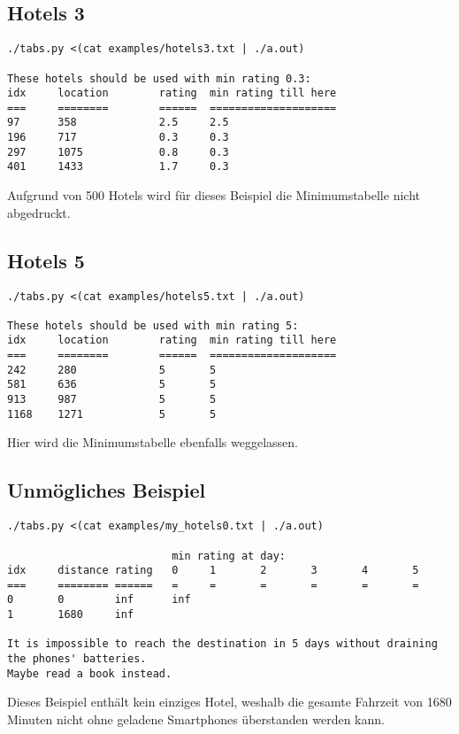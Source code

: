 \documentclass[a4paper,10pt,ngerman]{scrartcl}
\begin{document}
\subsection*{Hotels 3}
\begin{lstlisting}
./tabs.py <(cat examples/hotels3.txt | ./a.out)

These hotels should be used with min rating 0.3:
idx     location        rating  min rating till here
===     ========        ======  ====================
97      358             2.5     2.5
196     717             0.3     0.3
297     1075            0.8     0.3
401     1433            1.7     0.3
\end{lstlisting}
Aufgrund von 500 Hotels wird für dieses Beispiel die Minimumstabelle nicht abgedruckt.

\subsection*{Hotels 5}
\begin{lstlisting}
./tabs.py <(cat examples/hotels5.txt | ./a.out)

These hotels should be used with min rating 5:
idx     location        rating  min rating till here
===     ========        ======  ====================
242     280             5       5
581     636             5       5
913     987             5       5
1168    1271            5       5
\end{lstlisting}
Hier wird die Minimumstabelle ebenfalls weggelassen.

\subsection*{Unmögliches Beispiel}
\begin{lstlisting}
./tabs.py <(cat examples/my_hotels0.txt | ./a.out)

                          min rating at day:
idx     distance rating   0     1       2       3       4       5
===     ======== ======   =     =       =       =       =       =
0       0        inf      inf
1       1680     inf

It is impossible to reach the destination in 5 days without draining the phones' batteries.
Maybe read a book instead.
\end{lstlisting}
Dieses Beispiel enthält kein einziges Hotel, weshalb die gesamte Fahrzeit von 1680 Minuten nicht ohne geladene Smartphones überstanden werden kann.
\end{document}
